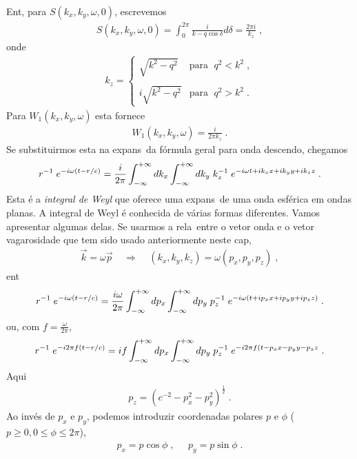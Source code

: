 Ent\ao, para $S(k_x,k_y,\omega,0)$, escrevemos
\begin{eqnarray}
S(k_x,k_y,\omega,0) = \int_0^{2\pi} \frac{i}{k-q\cos\delta}d\delta =
\frac{2\pi i}{k_z} \; ,
\end{eqnarray}
onde
\begin{eqnarray}
k_z = \left\{
\begin{array}{ll}
\sqrt{k^2-q^2} & \mbox{para } \; q^2 < k^2 \; , \\
               &                                \\
i\sqrt{k^2-q^2} & \mbox{para } \; q^2 > k^2 \; .
\end{array} 
\right.
\end{eqnarray}
Para $W_1(k_x,k_y,\omega)$ esta fornece
\begin{eqnarray}
W_1(k_x,k_y,\omega) = \frac{i}{2 \pi k_z} \; .
\end{eqnarray}
Se  substituirmos esta na expans\ao\ da f\'ormula geral para onda
descendo, chegamos
\begin{eqnarray}
r^{-1} \; e^{-i\omega(t -  r/c)} = \frac{i}{2\pi} \int_{-\infty}^{+\infty} dk_x \int_{-\infty}^{+\infty} dk_y \;
k_z^{-1} \; e^{-i\omega t + ik_x x + ik_y y + ik_z z} \; .
\end{eqnarray}
Esta \'e a {\it integral de Weyl} que oferece uma expans\ao\ de uma onda
esf\'erica em ondas planas. A integral de Weyl \'e conhecida de v\'arias
formas diferentes. Vamos apresentar algumas delas. Se usarmos a rela\cao\
entre o vetor onda e o vetor vagarosidade que tem sido usado anteriormente
neste cap\itulo,
\begin{eqnarray}
\vec{k} = \omega \vec{p} \;\;\;\; \Longrightarrow \;\;\;\;
(k_x,k_y,k_z) = \omega (p_x,p_y,p_z) \; ,
\end{eqnarray}
ent\ao
\begin{eqnarray}
r^{-1} \; e^{-i\omega(t - r/c)} = \frac{i\omega}{2\pi} \int_{-\infty}^{+\infty} dp_x \int_{-\infty}^{+\infty} dp_y \;
p_z^{-1} \; e^{-i\omega (t + ip_x x + ip_y y + ip_z z)} \; .
\end{eqnarray}
ou, com $f=\frac{\omega}{2\pi}$,
\begin{eqnarray}
r^{-1} \; e^{-i2\pi f(t - r/c)} = i f \int_{-\infty}^{+\infty} dp_x \int_{-\infty}^{+\infty} dp_y \;
p_z^{-1} \; e^{-i 2\pi f (t - p_x x - p_y y - p_z z} \; .
\end{eqnarray}
Aqui
\begin{eqnarray}
p_z = (c^{-2} - p_x^2 - p_y^2)^{\frac{1}{2}} \; .
\end{eqnarray}
Ao inv\'es de $p_x$ e $p_y$, podemos introduzir coordenadas polares $p$ 
e $\phi$ ($p \geq 0, 0 \leq \phi \leq 2\pi$),
\begin{eqnarray}
p_x = p \cos\phi \; , \;\;\;\;\; p_y = p \sin\phi \; .
\end{eqnarray}

